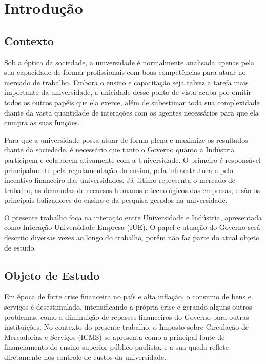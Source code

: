 \chapter[Introdução]{Introdução}
\label{chap:introducao}
\section{Contexto}
\label{cha:contexto}

Sob a óptica da sociedade, a universidade é normalmente analisada apenas pela sua capacidade de formar profissionais com boas competências para atuar no mercado de trabalho. Embora o ensino e capacitação seja talvez a tarefa mais importante da universidade, a unicidade desse ponto de vista acaba por omitir todos os outros papéis que ela exerce, além de subestimar toda sua complexidade diante da vasta quantidade de interações com os agentes necessários para que ela cumpra as suas funções.

Para que a universidade possa atuar de forma plena e maximize os resultados diante da sociedade, é necessário que tanto o Governo quanto a Indústria participem e colaborem ativamente com a Universidade. O primeiro é responsável principalmente pela regulamentação do ensino, pela infraestrutura e pelo incentivo financeiro das universidades. Já último representa o mercado de trabalho, as demandas de recursos humanos e tecnológicos das empresas, e são os principais balizadores do ensino e da pesquisa gerados na universidade.

O presente trabalho foca na interação entre Universidade e Indústria, apresentada como Interação Universidade-Empresa (IUE). O papel e atuação do Governo será descrito diversas vezes ao longo do trabalho, porém não faz parte do atual objeto de estudo.

\section{Objeto de Estudo}

Em época de forte crise financeira no país e alta inflação, o consumo de bens e serviços é desestimulado, intensificando a própria crise e gerando alguns outros problemas, como a diminuição de repasses financeiros do Governo para outras instituições. No contexto do presente trabalho, o Imposto sobre Circulação de Mercadorias e Serviços (ICMS) se apresenta como a  principal fonte de financiamento do ensino superior público paulista, e a sua queda reflete diretamente nos controle de custos da universidade.

